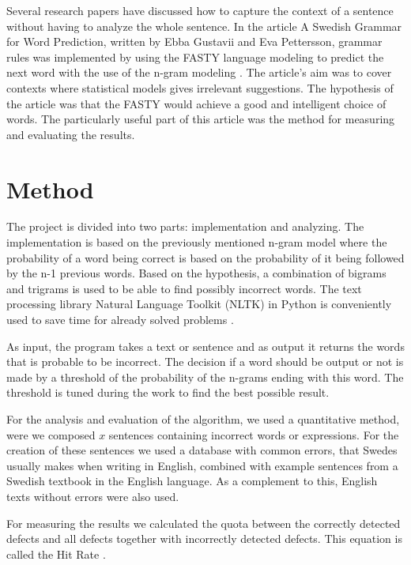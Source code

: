 \documentclass[a4paper,12pt]{article}
\begin{document}
Several research papers have discussed how to capture the context of a sentence without having to analyze the whole sentence. In the article A Swedish Grammar for Word Prediction, written by Ebba Gustavii and Eva Pettersson, grammar rules was implemented by using the FASTY language modeling to predict the next word with the use of the n-gram modeling \cite{gustavii2003a}. The article's aim was to cover contexts where statistical models gives irrelevant suggestions. The hypothesis of the article was that the FASTY would achieve a good and intelligent choice of words. The particularly useful part of this article was the method for measuring and evaluating the results.

\section{Method}
\label{sec:method}
The project is divided into two parts: implementation and analyzing. 
The implementation is based on the previously mentioned n-gram model where the probability of a word being correct is based on the probability of it being followed by the n-1 previous words. Based on the hypothesis, a combination of bigrams and trigrams is used to be able to find possibly incorrect words. The text processing library Natural Language Toolkit (NLTK) in Python is conveniently used to save time for already solved problems \cite{loper2002nltk}. 

As input, the program takes a text or sentence and as output it returns the words that is probable to be incorrect. The decision if a word should be output or not is made by a threshold of the probability of the n-grams ending with this word. The threshold is tuned during the work to find the best possible result. 

For the analysis and evaluation of the algorithm, we used a quantitative method, were we composed $x$ sentences containing incorrect words or expressions. For the creation of these sentences we used a database with common errors, that Swedes usually makes when writing in English, combined with example sentences from a Swedish textbook in the English language. As a complement to this, English texts without errors were also used.

For measuring the results we calculated the quota between the correctly detected defects and all defects together with incorrectly detected defects. This equation is called the Hit Rate \cite{wikipedia2014hitrate, ghayoomi2005word}.
\end{document}
